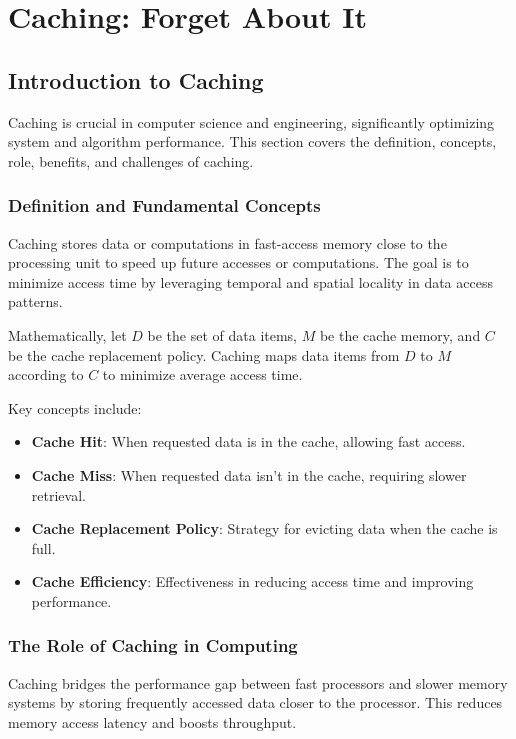 \documentclass[12pt]{book} %
\begin{document}
\chapter{Caching: Forget About It}

\section{Introduction to Caching}

Caching is crucial in computer science and engineering, significantly optimizing system and algorithm performance. This section covers the definition, concepts, role, benefits, and challenges of caching.

\subsection{Definition and Fundamental Concepts}

Caching stores data or computations in fast-access memory close to the processing unit to speed up future accesses or computations. The goal is to minimize access time by leveraging temporal and spatial locality in data access patterns.

Mathematically, let \(D\) be the set of data items, \(M\) be the cache memory, and \(C\) be the cache replacement policy. Caching maps data items from \(D\) to \(M\) according to \(C\) to minimize average access time.

Key concepts include:

\begin{itemize}
    \item \textbf{Cache Hit}: When requested data is in the cache, allowing fast access.
    \item \textbf{Cache Miss}: When requested data isn't in the cache, requiring slower retrieval.
    \item \textbf{Cache Replacement Policy}: Strategy for evicting data when the cache is full.
    \item \textbf{Cache Efficiency}: Effectiveness in reducing access time and improving performance.
\end{itemize}

\subsection{The Role of Caching in Computing}

Caching bridges the performance gap between fast processors and slower memory systems by storing frequently accessed data closer to the processor. This reduces memory access latency and boosts throughput.
\end{document}
